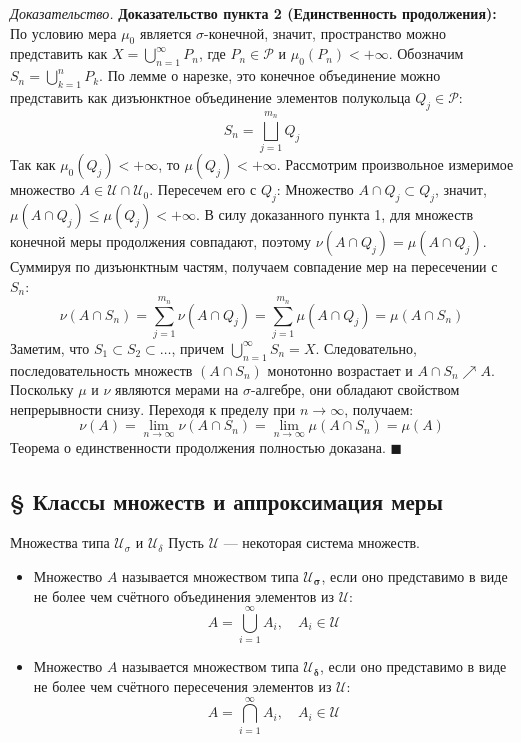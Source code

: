 \documentclass[12pt,a4paper]{article}
\newenvironment{Proof}[1][Доказательство]{\vspace{0.5em}\noindent\textit{#1.}\hspace{0.5em}\ignorespaces}{\hfill$\blacksquare$\vspace{1em}}
\begin{document}
\begin{Proof}
\textbf{Доказательство пункта 2 (Единственность продолжения):} \\
По условию мера $\mu_0$ является $\sigma$-конечной, значит, пространство можно представить как $X = \bigcup\limits_{n=1}^{\infty} P_n$, где $P_n \in \mathcal{P}$ и $\mu_0(P_n) < +\infty$.
Обозначим $S_n = \bigcup\limits_{k=1}^n P_k$. По лемме о нарезке, это конечное объединение можно представить как дизъюнктное объединение элементов полукольца $Q_j \in \mathcal{P}$:
$$ S_n = \bigsqcup\limits_{j=1}^{m_n} Q_j $$
Так как $\mu_0(Q_j) < +\infty$, то $\mu(Q_j) < +\infty$.
Рассмотрим произвольное измеримое множество $A \in \mathcal{U} \cap \mathcal{U}_0$. Пересечем его с $Q_j$:
Множество $A \cap Q_j \subset Q_j$, значит, $\mu(A \cap Q_j) \le \mu(Q_j) < +\infty$. 
В силу доказанного пункта 1, для множеств конечной меры продолжения совпадают, поэтому $\nu(A \cap Q_j) = \mu(A \cap Q_j)$.
Суммируя по дизъюнктным частям, получаем совпадение мер на пересечении с $S_n$:
$$ \nu(A \cap S_n) = \sum\limits_{j=1}^{m_n} \nu(A \cap Q_j) = \sum\limits_{j=1}^{m_n} \mu(A \cap Q_j) = \mu(A \cap S_n) $$
Заметим, что $S_1 \subset S_2 \subset \dots$, причем $\bigcup\limits_{n=1}^{\infty} S_n = X$. Следовательно, последовательность множеств $(A \cap S_n)$ монотонно возрастает и $A \cap S_n \nearrow A$. 
Поскольку $\mu$ и $\nu$ являются мерами на $\sigma$-алгебре, они обладают свойством непрерывности снизу. Переходя к пределу при $n \to \infty$, получаем:
$$ \nu(A) = \lim\limits_{n \to \infty} \nu(A \cap S_n) = \lim\limits_{n \to \infty} \mu(A \cap S_n) = \mu(A) $$
Теорема о единственности продолжения полностью доказана.
\end{Proof}


\subsection{§ Классы множеств и аппроксимация меры}

\begin{Definition}{Множества типа $\mathcal{U}_\sigma$ и $\mathcal{U}_\delta$}{}
Пусть $\mathcal{U}$ — некоторая система множеств.
\begin{itemize}
    \item Множество $A$ называется множеством типа $\mathbf{\mathcal{U}_\sigma}$, если оно представимо в виде не более чем счётного объединения элементов из $\mathcal{U}$:
    $$ A = \bigcup\limits_{i=1}^{\infty} A_i, \quad A_i \in \mathcal{U} $$
    \item Множество $A$ называется множеством типа $\mathbf{\mathcal{U}_\delta}$, если оно представимо в виде не более чем счётного пересечения элементов из $\mathcal{U}$:
    $$ A = \bigcap\limits_{i=1}^{\infty} A_i, \quad A_i \in \mathcal{U} $$
\end{itemize}
\end{Definition}
\end{document}
